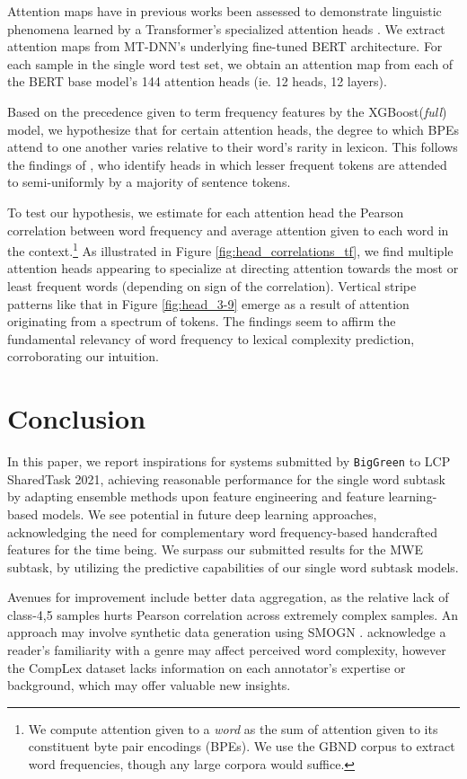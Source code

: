 \documentclass[11pt,a4paper]{article}
\begin{document}
Attention maps have in previous works been assessed to demonstrate linguistic phenomena learned by a Transformer's specialized attention heads \citep{190509418, 190604341}. We extract attention maps from MT-DNN's underlying fine-tuned BERT architecture. For each sample in the single word test set, we obtain an attention map from each of the BERT base model's 144 attention heads (ie. 12 heads, 12 layers).

Based on the precedence given to term frequency features by the XGBoost(\textit{full}) model, we hypothesize that for certain attention heads, the degree to which BPEs attend to one another varies relative to their word's rarity in lexicon. This follows the findings of \citet{190509418}, who identify heads in which lesser frequent tokens are attended to semi-uniformly by a majority of sentence tokens. 

To test our hypothesis, we estimate for each attention head the Pearson correlation between word frequency and average attention given to each word in the context.\footnote{We compute attention given to a \textit{word} as the sum of attention given to its constituent byte pair encodings (BPEs). We use the GBND corpus to extract word frequencies, though any large corpora would suffice.} As illustrated in Figure \ref{fig:head_correlations_tf}, we find multiple attention heads appearing to specialize at directing attention towards the most or least frequent words (depending on sign of the correlation). Vertical stripe patterns like that in Figure \ref{fig:head_3-9} emerge as a result of attention originating from a spectrum of tokens. The findings seem to affirm the fundamental relevancy of word frequency to lexical complexity prediction, corroborating our intuition.

\section{Conclusion}

In this paper, we report inspirations for systems submitted by \texttt{BigGreen} to LCP SharedTask 2021, achieving reasonable performance for the single word subtask by adapting ensemble methods upon feature engineering and feature learning-based models. We see potential in future deep learning approaches, acknowledging the need for complementary word frequency-based handcrafted features for the time being. We surpass our submitted results for the MWE subtask, by utilizing the predictive capabilities of our single word subtask models.

Avenues for improvement include better data aggregation, as the relative lack of class-4,5 samples hurts Pearson correlation across extremely complex samples. An approach may involve synthetic data generation using SMOGN \citep{pmlrv74branco17a}. \citet{shardlow2020complex} acknowledge a reader's familiarity with a genre may affect perceived word complexity, however the CompLex dataset lacks information on each annotator's expertise or background, which may offer valuable new insights.




\end{document}
